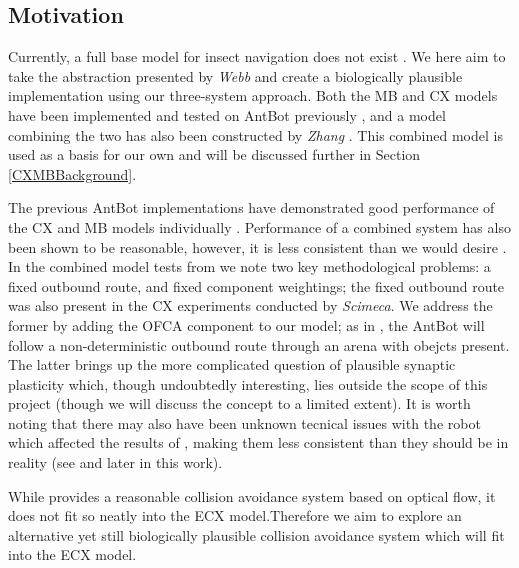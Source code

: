 \documentclass[a4paper,11pt,twoside,openright]{article}
\begin{document}
\subsection{ Motivation }
Currently, a full base model for insect navigation does not exist
\cite{Webb2019}. We here aim to take the abstraction presented by
\textit{Webb} and create a biologically plausible implementation using
our three-system approach. Both the MB and CX models have been
implemented and tested on AntBot previously \cite{Scimeca2017,
  Mitchell2018, Eberding2016, Zhang2017}, and a model combining the
two has also been constructed by \textit{Zhang} \cite{Zhang2017}.
This combined model is used as a basis for our own and will be
discussed further in Section \ref{CXMBBackground}.
\newline
\par

The previous AntBot implementations have demonstrated good performance
of the CX and MB models individually \cite{Scimeca2017,
  Mitchell2018}. Performance of a combined system has also been shown
to be reasonable, however, it is less consistent than we would desire
\cite{Zhang2017}. In the combined model tests from \cite{Zhang2017} we
note two key methodological problems: a fixed outbound route, and
fixed component weightings; the fixed outbound route was also present
in the CX experiments conducted by \textit{Scimeca}. We address the
former by adding the OFCA component to our model; as in
\cite{Mitchell2018}, the AntBot will follow a non-deterministic
outbound route through an arena with obejcts present. The latter
brings up the more complicated question of plausible synaptic
plasticity which, though undoubtedly interesting, lies outside the
scope of this project (though we will discuss the concept to a limited
extent). It is worth noting that there may also have been unknown
tecnical issues with the robot which affected the results of
\cite{Zhang2017}, making them less consistent than they should be in
reality (see \cite{Mitchell2018} and later in this work).
\newline
\par

While \cite{Mitchell2018} provides a reasonable collision avoidance
system based on optical flow, it does not fit so neatly into the ECX
model.Therefore we aim to explore an alternative yet still
biologically plausible collision avoidance system which will fit into
the ECX model.
\newline
\par
\end{document}
